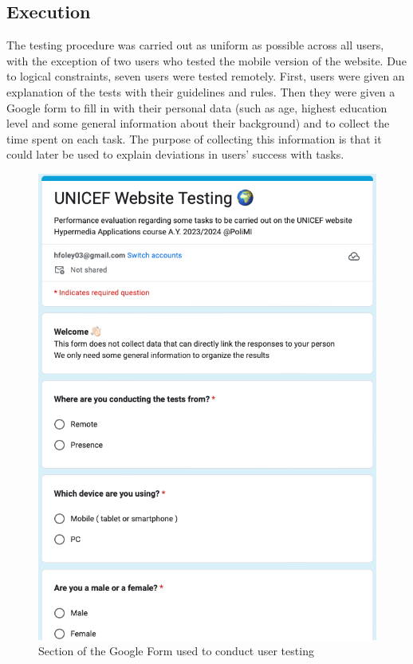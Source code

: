 \newpage
\subsection{Execution}
The testing procedure was carried out as uniform as possible across all users, with the exception of two users who tested the mobile version of the website. 
Due to logical constraints, seven users were tested remotely. 
First, users were given an explanation of the tests with their guidelines and rules.  
Then they were given a Google form to fill in with their personal data (such as age, highest education level and some general information about their background) and to collect the time spent on each task. 
The purpose of collecting this information is that it could later be used to explain deviations in users' success with tasks.

\begin{figure}[htp!]
    \centering
    \includegraphics[scale=0.4]{Resources/Harry/GoogleForm.png}
    \caption{Section of the Google Form used to conduct user testing}
\end{figure}

